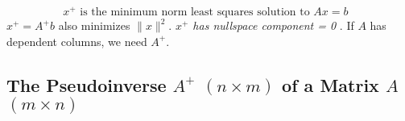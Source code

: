 \[
    \text{\(x^+\) is the minimum norm least squares solution to \(Ax = b\)  }
\]
\(x^+ = A^+ b\) also minimizes \(\lVert x \rVert^2 \). \emph{\(x^+\) has nullspace component = 0 }. If \(A\) has dependent columns, we need \(A^+\).

\subsection{The Pseudoinverse \(A^+\) \((n \times m)\)  of a Matrix \(A\) \((m \times n)\)}




